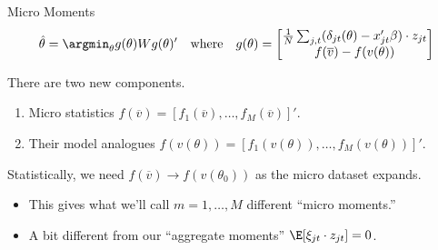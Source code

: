 \documentclass[aspectratio=169,t,11pt,table]{beamer}
\begin{document}
\begin{frame}{Micro Moments}
    \begin{equation*}
        \hat{\theta} = \argmin_\theta g(\theta) W g(\theta)' \quad\text{where}\quad g(\theta) =
        \begin{bmatrix}
            \frac{1}{N} \sum_{j,t} (\delta_{jt}(\theta) - x_{jt}'\beta) \cdot z_{jt} \\
            f(\overline{v}) - f(v(\theta))
        \end{bmatrix}
    \end{equation*}
    \begin{wideitemize}
        \item There are two new components.
        \begin{enumerate}
            \item Micro statistics $f(\overline{v}) = [f_1(\overline{v}), \dots, f_M(\overline{v})]'$.
            \item Their model analogues $f(v(\theta)) = [f_1(v(\theta)), \dots, f_M(v(\theta))]'$.
        \end{enumerate}
        \pause
        \item Statistically, we need $f(\overline{v}) \to f(v(\theta_0))$ as the micro dataset expands.
        \begin{itemize}
            \item This gives what we'll call $m = 1, \dots, M$ different ``\alert{micro moments}.''
            \item A bit different from our ``aggregate moments'' $\E[\xi_{jt} \cdot z_{jt}] = 0$.
        \end{itemize}
    \end{wideitemize}
\end{frame}
\end{document}
